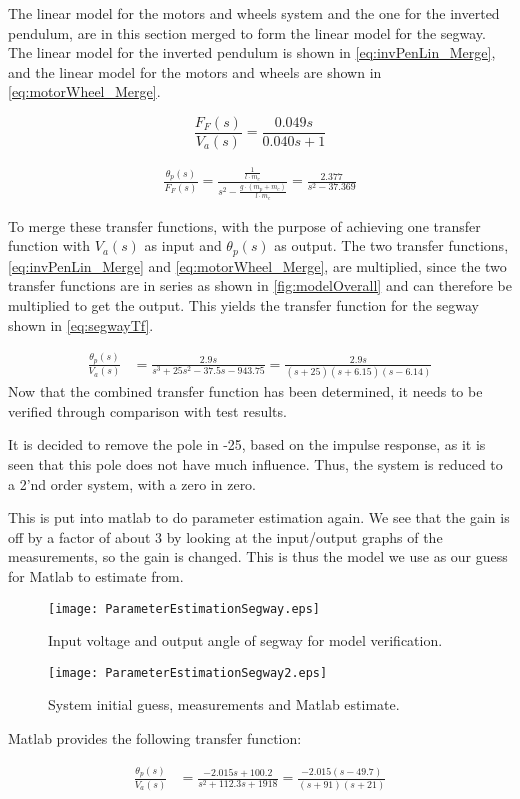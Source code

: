 The linear model for the motors and wheels system and the one for the inverted pendulum, are in this section merged to form the linear model for the segway. The linear model for the inverted pendulum is shown in \autoref{eq:invPenLin_Merge}, and the linear model for the motors and wheels are shown in \autoref{eq:motorWheel_Merge}.

\begin{equation}
\frac{F_F(s)}{V_a(s)} = \frac{0.049s}{0.040s + 1}
\label{eq:motorWheel_Merge}
\end{equation}

\begin{align}
\frac{\theta_p(s)}{F_F(s)}=\frac{\frac{1}{l\cdot m_c}}{s^2-\frac{g\cdot (m_p+m_c)}{l\cdot m_c}}=\frac{2.377}{s^2 - 37.369}
\label{eq:invPenLin_Merge}
\end{align}

To merge these transfer functions, with the purpose of achieving one transfer function with $V_a(s)$ as input and $\theta_p(s)$ as output. The two transfer functions, \autoref{eq:invPenLin_Merge} and \autoref{eq:motorWheel_Merge}, are multiplied, since the two transfer functions are in series as shown in \autoref{fig:modelOverall} and can therefore be multiplied to get the output. This yields the transfer function for the segway shown in \autoref{eq:segwayTf}.

\begin{align}
\frac{\theta_p(s)}{V_a(s)} &= \frac{2.9s}{s^3 + 25s^2 - 37.5s - 943.75} = \frac{2.9s}{(s + 25)(s + 6.15)(s - 6.14)}
\label{eq:segwayTf}
\end{align} 
Now that the combined transfer function has been determined, it needs to be verified through comparison with test results.

It is decided to remove the pole in -25, based on the impulse response, as it is seen that this pole does not have much influence. Thus, the system is reduced to a 2'nd order system, with a zero in zero.

This is put into matlab to do parameter estimation again.
We see that the gain is off by a factor of about 3 by looking at the input/output graphs of the measurements, so the gain is changed. This is thus the model we use as our guess for Matlab to estimate from.
\begin{figure}[H]
    \centering
    \texttt{[image: ParameterEstimationSegway.eps]}
    \caption{Input voltage and output angle of segway for model verification.}
    \label{fig:paramEst3}
\end{figure} 


\begin{figure}[H]
    \centering
    \texttt{[image: ParameterEstimationSegway2.eps]}
    \caption{System initial guess, measurements and Matlab estimate.}
    \label{fig:paramEst4}
\end{figure} 

Matlab provides the following transfer function:

\begin{align}
\frac{\theta_p(s)}{V_a(s)} &= \frac{-2.015 s + 100.2}{s^2 + 112.3 s + 1918} = \frac{-2.015 (s - 49.7)}{(s + 91)(s + 21)}
\label{eq:wrongTF}
\end{align} 

